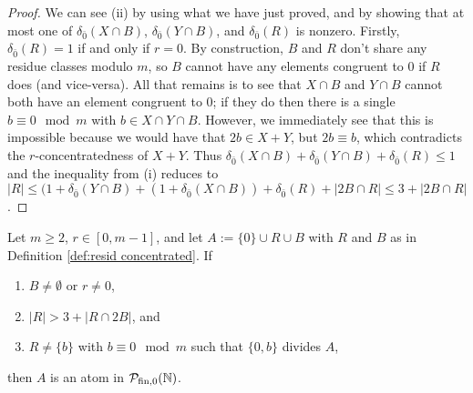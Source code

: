 \begin{proof}
We can see (ii) by using what we have just proved, and by showing that at most one of $\delta_{\bar{0}}(X\cap B)$, $\delta_{\bar{0}}(Y\cap B)$, and $\delta_{\bar{0}}(R)$ is nonzero.
Firstly, $\delta_{\bar{0}}(R) = 1$ if and only if $r = 0$.
By construction, $B$ and $R$ don't share any residue classes modulo $m$, so $B$ cannot have any elements congruent to $0$ if $R$ does (and vice-versa).  
All that remains is to see that $X\cap B$ and $Y\cap B$ cannot both have an element congruent to $0$; if they do then there is a single $b \equiv 0 \mod m$ with $b\in X\cap Y \cap B$.
However, we immediately see that this is impossible because we would have that $2b \in X+Y$, but $2b \equiv b$, which contradicts the $r$-concentratedness of $X+Y$.
Thus $\delta_{\bar{0}}(X\cap B) + \delta_{\bar{0}}(Y\cap B) + \delta_{\bar{0}}(R) \le 1$ and the inequality from (i) reduces to $|R| \le (1+\delta_{\bar{0}}(Y\cap B)+ (1+\delta_{\bar{0}}(X\cap B)) + \delta_{\bar{0}}(R) + |2B\cap R| \le 3 + |2B \cap R|$.
\end{proof}

\begin{prop}
Let $m\ge 2$, $r\in [0,m-1]$, and let $A := \{0\}\cup R \cup B$ with $R$ and $B$ as in Definition \ref{def:resid concentrated}.
If 
\begin{enumerate}[label={\rm (\arabic{*})}]
	\item $B\neq \emptyset$ or $r\neq 0$,
	\item $|R| > 3 + |R\cap 2B|$, and
	\item $R \neq \{b\}$ with $b\equiv 0 \mod m$ such that $\{0,b\}$ divides $A$,
\end{enumerate}
then $A$ is an atom in ${\mathcal{P}_{\textrm{fin},0}(\mathbb{N})}$.
\end{prop}

